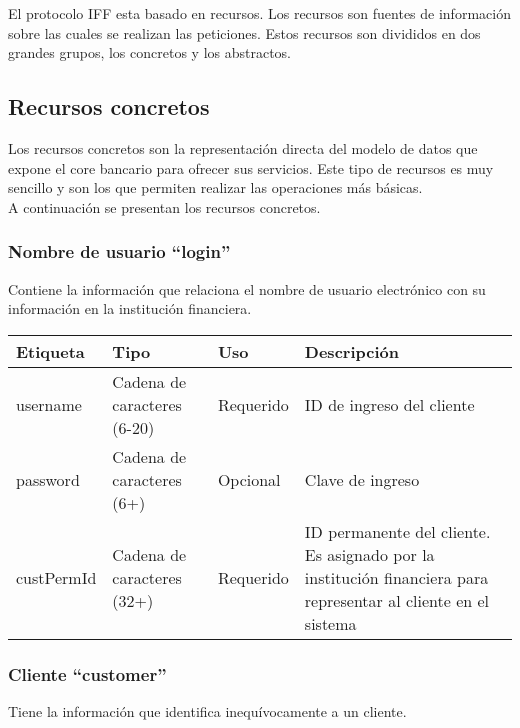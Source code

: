El protocolo IFF esta basado en recursos. Los recursos son fuentes de información sobre las cuales se realizan las peticiones. Estos recursos son divididos en dos grandes grupos, los concretos y los abstractos.

\subsection{Recursos concretos}
Los recursos concretos son la representación directa del modelo de datos que expone el core bancario para ofrecer sus servicios. Este tipo de recursos es muy sencillo y son los que permiten realizar las operaciones más básicas. \\

A continuación se presentan los recursos concretos.

\subsubsection{Nombre de usuario ``login''}
Contiene la información que relaciona el nombre de usuario electrónico con su información  en la institución financiera.

\begin{center}
\begin{tabular}{|>{\centering\arraybackslash}p{}|>{\centering\arraybackslash}p{}|>{\centering\arraybackslash}p{}|>{\centering\arraybackslash}p{}|}
\hline 
\bfseries {Etiqueta} & \bfseries {Tipo} & \bfseries {Uso} & \bfseries {Descripción} \\ 
\hline 
username & Cadena de caracteres (6-20) & Requerido & ID de ingreso del cliente \\ 
\hline 
password & Cadena de caracteres (6+) & Opcional & Clave de ingreso \\ 
\hline 
custPermId & Cadena de caracteres (32+) & Requerido & ID permanente del cliente. Es asignado por la institución financiera para representar al cliente en el sistema \\ 
\hline 
\end{tabular}
\end{center}

\subsubsection{Cliente ``customer''}
Tiene la información que identifica inequívocamente a un cliente.

